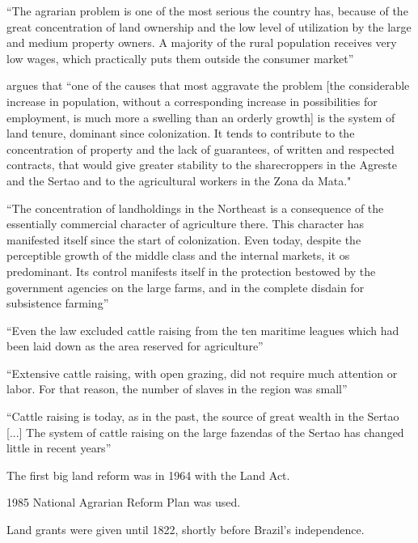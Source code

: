 \documentclass{article}
\begin{document}
\textcite[p.~1]{De_Oliveira_Andrade1980-xz}
``The agrarian problem is one of the most serious the country has, because of the great concentration of land ownership and the low level of utilization by the large and medium property owners. A majority of the rural population receives very low wages, which practically puts them outside the consumer market''

\textcite[p.~34-35]{De_Oliveira_Andrade1980-xz} argues that 
``one of the causes that most aggravate the problem [the considerable increase in population, without a corresponding increase in possibilities for employment, is much more a swelling than an orderly growth] is the system of land tenure, dominant since colonization. It tends to contribute to the concentration of property and the lack of guarantees, of written and respected contracts, that would give greater stability to the sharecroppers in the Agreste and the Sertao and to the agricultural workers in the Zona da Mata."

\textcite[p.~36]{De_Oliveira_Andrade1980-xz}
``The concentration of landholdings in the Northeast is a consequence of the essentially commercial character of agriculture there. This character has manifested itself since the start of colonization. Even today, despite the perceptible growth of the middle class and the internal markets, it os predominant. Its control manifests itself in the protection bestowed by the government agencies on the large farms, and in the complete disdain for subsistence farming''

\textcite[p.~216]{Junior1967-jv}
``Even the law excluded cattle raising from the ten maritime  leagues which had been laid down as the area reserved for  agriculture''

\textcite[p.~113]{De_Oliveira_Andrade1980-xz}
``Extensive cattle raising, with open grazing, did not require much attention or labor. For that reason, the number of slaves in the region was small''

\textcite[p.~157]{De_Oliveira_Andrade1980-xz}
``Cattle raising is today, as in the past, the source of great wealth in the Sertao [...] The system of cattle raising on the large fazendas of the Sertao has changed little in recent years''

The first big land reform was in 1964 with the Land Act.

1985 National Agrarian Reform Plan was used.

Land grants were given until 1822, shortly before Brazil's independence.
\end{document}

